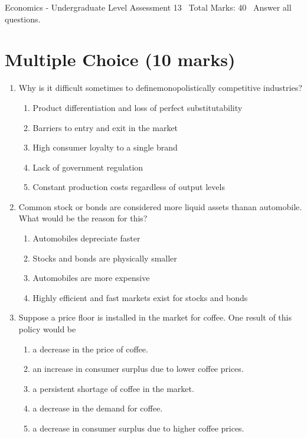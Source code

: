 \documentclass[12pt]{article}
\begin{document}
\begin{center}
Economics - Undergraduate Level Assessment 13 \
Total Marks: 40 \
Answer all questions.
\end{center}

\section*{Multiple Choice (10 marks)}
\begin{enumerate}[label=\arabic*.]
\item Why is it difficult sometimes to definemonopolistically competitive industries?
\begin{enumerate}[label=(\alph*)]
    \item Product differentiation and loss of perfect substitutability
    \item Barriers to entry and exit in the market
    \item High consumer loyalty to a single brand
    \item Lack of government regulation
    \item Constant production costs regardless of output levels
\end{enumerate}
\item Common stock or bonds are considered more liquid assets thanan automobile. What would be the reason for this?
\begin{enumerate}[label=(\alph*)]
    \item Automobiles depreciate faster
    \item Stocks and bonds are physically smaller
    \item Automobiles are more expensive
    \item Highly efficient and fast markets exist for stocks and bonds
\end{enumerate}
\item Suppose a price floor is installed in the market for coffee. One result of this policy would be
\begin{enumerate}[label=(\alph*)]
    \item a decrease in the price of coffee.
    \item an increase in consumer surplus due to lower coffee prices.
    \item a persistent shortage of coffee in the market.
    \item a decrease in the demand for coffee.
    \item a decrease in consumer surplus due to higher coffee prices.
\end{enumerate}

\end{enumerate}
\end{document}
